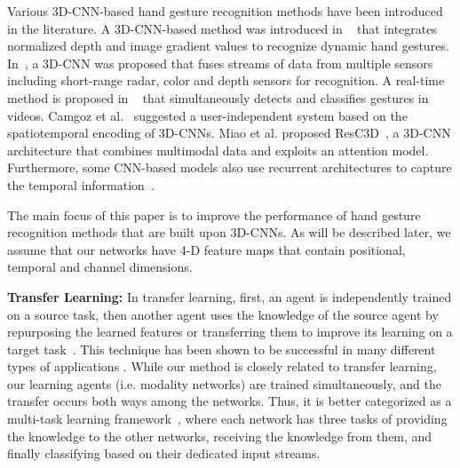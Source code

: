 \documentclass[10pt,twocolumn,letterpaper]{article}
\begin{document}
Various 3D-CNN-based hand gesture recognition methods have been introduced in the literature.  A 3D-CNN-based method was introduced in ~\cite{molchanov2015hand} that integrates normalized depth and image gradient values to recognize dynamic hand gestures.  In~\cite{molchanov2015multi}, a 3D-CNN was proposed that fuses streams of data from multiple sensors including short-range radar, color and depth sensors for recognition.   A real-time method is proposed in ~\cite{molchanov2016online} that simultaneously detects and classifies gestures in videos.  Camgoz et al.~\cite{camgoz2016using} suggested a user-independent system based on the spatiotemporal encoding of 3D-CNNs.   Miao et al. proposed ResC3D~\cite{miao2017multimodal}, a 3D-CNN architecture that combines multimodal data and exploits an attention model. Furthermore, some CNN-based models also use recurrent  architectures to capture the temporal  information~\cite{zhang2017learning,cao2017egocentric,cui2017recurrent,zhu2017multimodal}.

 The main focus of this paper is to improve the performance of hand gesture recognition methods that are built upon 3D-CNNs.  As will be described later, we assume that our networks have 4-D feature maps that contain positional, temporal and channel dimensions.  
 
\noindent \textbf{Transfer Learning:}
In transfer learning, first, an agent is independently trained on a source task,  then another agent uses the knowledge of the source agent by repurposing the learned features or transferring them to improve its learning on a target task~\cite{pan2010survey,torrey2010transfer}.  This technique has been shown to be successful in many different types of applications  \cite{bengio2012deep,oquab2014learning,karpathy2014large,huang2013cross,yosinski2014transferable,Perera_CVPR19_1}.
While our method is closely related to transfer learning,  our learning agents (i.e. modality networks) are trained simultaneously, and the transfer occurs both ways among the networks.   Thus, it is better categorized as a multi-task learning framework~\cite{caruana1997multitask,oza2019deep}, where each network has three tasks of providing the knowledge to the other networks, receiving the knowledge from them, and finally classifying based on their dedicated input streams.
\end{document}
